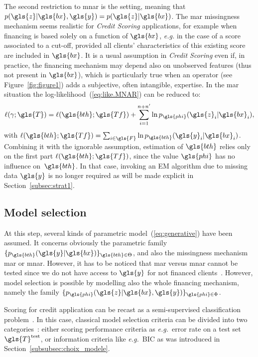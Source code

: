 The second restriction to \gls{mnar} is the  setting, meaning that $p(\gls{z}| \gls{bx},\gls{y}) = p(\gls{z}|\gls{bx})$. The \gls{mar} missingness mechanism seems realistic for \textit{Credit Scoring} applications, for example when financing is based solely on a function of $\gls{bx}$, {\it e.g.} in the case of a score associated to a cut-off, provided all clients' characteristics of this existing \gls{score} are included in $\gls{bx}$. It is a usual assumption in \textit{Credit Scoring} even if, in practice, the financing mechanism may depend also on unobserved features (thus not present in $\gls{bx}$), which is particularly true when an operator (see Figure~\ref{fig:figure1}) adds a subjective, often intangible, expertise. In the \gls{mar} situation the log-likelihood~(\ref{eq:like.MNAR}) can be reduced to:
\begin{equation}\label{eq:like.MAR}
\ell(\gamma;\gls{T}) = \ell(\gls{bth};\gls{Tf}) + \sum_{i=1}^{n+n'} \ln p_{\gls{phi}}(\gls{z}_{i} | \gls{bx}_{i}),
\end{equation}
with $\ell(\gls{bth};\gls{Tf})=\sum_{i\in\gls{F}}\ln p_{\gls{bth}}(\gls{y}_i | \gls{bx}_i)$.
Combining it with the ignorable assumption, estimation of $\gls{bth}$ relies only on the first part $\ell(\gls{bth};\gls{Tf})$, since the value $\gls{phi}$ has no influence on~$\gls{bth}$. In that case, invoking an EM algorithm due to missing data $\gls{y}$ is no longer required as will be made explicit in Section~\ref{subsec:strat1}.

\subsection{Model selection} \label{subsec:model_selection}

At this step, several kinds of parametric model~(\ref{eq:generative}) have been assumed. It concerns obviously the parametric family $\{p_{\gls{bth}}(\gls{y}|\gls{bx})\}_{\gls{bth} \in\Theta}$, and also the missingness mechanism \gls{mar} or \gls{mnar}. 
However, it has to be noticed that \gls{mar} versus \gls{mnar} cannot be tested since we do not have access to $\gls{y}$ for not financed clients~\cite{molenberghs2008every}. However, model selection is possible by modelling also the whole financing mechanism, namely the family $\{p_{\gls{phi}}(\gls{z}|\gls{bx},\gls{y})\}_{\gls{phi} \in \Phi}$.


Scoring for credit application can be recast as a semi-supervised classification problem~\cite{Chapelle:2010:SL:1841234}. In this case, classical model selection criteria can be divided into two categories~\cite{vandewalle:tel-00447141}: either scoring performance criteria as \textit{e.g.}\ error rate on a test set $\gls{T}^{\text{test}}$, or information criteria like \textit{e.g.}\ BIC as was introduced in Section~\ref{subsubsec:choix_modele}.

